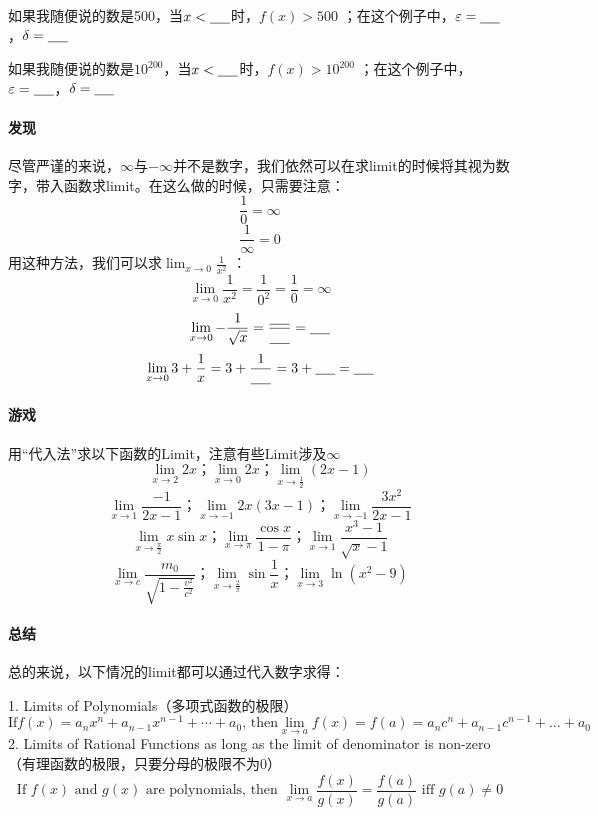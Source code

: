 \documentclass[UTF8]{ctexart}
\begin{document}
如果我随便说的数是500，当$x<\underline{\hbox to 5mm{}}$时，$f(x) > 500$ ；在这个例子中，$\varepsilon = \underline{\hbox to 5mm{}}$，$\delta=\underline{\hbox to 5mm{}}$

如果我随便说的数是$10^200$，当$x<\underline{\hbox to 5mm{}}$时，$f(x) > 10^200$ ；在这个例子中，$\varepsilon = \underline{\hbox to 5mm{}}$，$\delta=\underline{\hbox to 5mm{}}$

\paragraph{发现}
尽管严谨的来说，$\infty$与$-\infty$并不是数字，我们依然可以在求limit的时候将其视为数字，带入函数求limit。在这么做的时候，只需要注意：
\[ \frac{1}{0} = \infty \]
\[\frac{1}{\infty} = 0 \]
用这种方法，我们可以求${\lim_{x \to 0} \frac{1}{x^2}}$ ：
\[{\lim_{x \to 0} \frac{1}{x^2} = \frac{1}{0 ^ 2} = \frac{1}{0} = \infty} \]
 \[{\lim_{x \to 0} -\frac{1}{\sqrt{x}}} = \frac{\underline{\hbox to 5mm{}}}{\underline{\hbox to 5mm{}}} = \underline{\hbox to 5mm{}} \]
\[{\lim_{x \to 0} 3+\frac{1}{x} = 3+ \frac{1}{\underline{\hbox to 5mm{}}} = 3+\underline{\hbox to 5mm{}} = \underline{\hbox to 5mm{}}} \]

\paragraph{游戏}
用“代入法”求以下函数的Limit，注意有些Limit涉及$\infty$
\[ {\lim_{x \to 2} 2x } \text{；} {\lim_{x \to 0} 2x} \text{；} {\lim_{x \to \frac{1}{2}} (2x-1)}\]
\[ {\lim_{x \to 1} \frac{-1}{2x-1} } \text{；} {\lim_{x \to -1} 2x(3x-1)} \text{；} {\lim_{x \to -1} \frac{3x^2}{2x-1}}\]
\[ {\lim_{x \to \frac{\pi}{2}} x\sin{x} } \text{；} {\lim_{x \to \pi} \frac{\cos{x}}{1-\pi}} \text{；} {\lim_{x \to 1} \frac{x^3-1}{\sqrt{x} - 1}}\]
\[ {\lim_{x \to c} \frac{m_0}{\sqrt{1-\frac{v^2}{c^2}}} } \text{；} {\lim_{x \to \frac{2}{\pi}} \sin{\frac{1}{x}}} \text{；} {\lim_{x \to 3} \ln{(x^2-9)}}\]

\paragraph{总结}
总的来说，以下情况的limit都可以通过代入数字求得：

1. Limits of Polynomials（多项式函数的极限）
\[\text{If} f(x) = a_nx^n + a_{n-1}x^{n-1}+\cdots+a_0 \text{, then} {\lim_{x \to a} f(x) = f(a) = a_nc^n + a_{n-1}c^{n-1}+\ldots+a_0}\]
2. Limits of Rational Functions as long as the limit of denominator is non-zero（有理函数的极限，只要分母的极限不为0）
\[\text{If } f(x) \text{ and } g(x) \text{ are polynomials, then } {\lim_{x \to a} \frac{f(x)}{g(x)} = \frac{f(a)}{g(a)}} \text{ iff } g(a) \not = 0 \]
\end{document}
